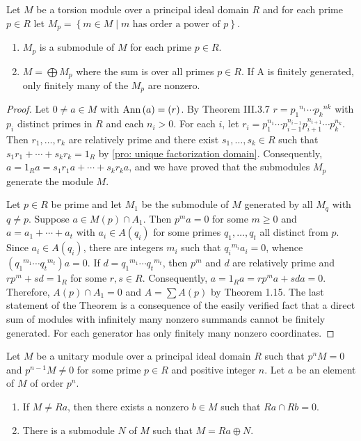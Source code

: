 \begin{theorem}
    Let $M$ be a torsion module over a principal ideal domain $R$ and for each prime $p \in R$ let $M_p=\left\{m \in M \mid m \text{ has order a power of } p\right\}$.
    \begin{enumerate}
        \item
              $M_p$ is a submodule of $M$ for each prime $p \in R$.

        \item
              $M=\bigoplus M_p$ where the sum is over all primes $p \in R$. If A is finitely generated, only finitely many of the $M_p$ are nonzero.
    \end{enumerate}
    \begin{proof}
        Let $0 \neq a \in M$ with $\operatorname{\operatorname{Ann}}\left(a\right)=(r)$.
        By Theorem III.3.7 $r=p_1{ }^{n_1} \cdots p_k{ }^{n k}$ with $p_i$ distinct primes in $R$ and each $n_i>0$.
        For each $i$, let $r_i=p_1^{n_1} \cdots p_{i-1}^{n_{i-1}} p_{i+1}^{n_{i+1}} \cdots p_k^{n_k}$.
        Then $r_1, \ldots, r_k$ are relatively prime and there exist $s_1, \ldots, s_k \in R$ such that $s_1 r_1+\cdots+ s_k r_k=1_R$ by \ref{pro: unique factorization domain}.
        Consequently, $a=1_R a=s_1 r_1 a+\cdots+s_k r_k a$, and we have proved that the submodules $M_p$ generate the module $M$.

        Let $p \in R$ be prime and let $M_1$ be the submodule of $M$ generated by all $M_q$ with $q \neq p$.
        Suppose $a \in M(p) \cap A_1$. Then $p^m a=0$ for some $m \geq 0$ and $a=a_1+\cdots+a_t$ with $a_i \in A\left(q_i\right)$ for some primes $q_1, \ldots, q_t$ all distinct from $p$. Since $a_i \in A\left(q_i\right)$, there are integers $m_i$ such that $q_i{ }^{m_i} a_i=0$, whence $\left(q_1{ }^{m_1} \cdots q_t{ }^{m_t}\right) a=0$. If $d=q_1{ }^{m_1} \cdots q_t{ }^{m_t}$, then $p^m$ and $d$ are relatively prime and $r p^m+s d=1_R$ for some $r, s \in R$. Consequently, $a=1_R a=r p^m a+s d a=0$. Therefore, $A(p) \cap A_1=0$ and $A=\sum A(p)$ by Theorem 1.15. The last statement of the Theorem is a consequence of the easily verified fact that a direct sum of modules with infinitely many nonzero summands cannot be finitely generated. For each generator has only finitely many nonzero coordinates.
    \end{proof}
\end{theorem}
\begin{lemma}
    Let $M$ be a unitary module over a principal ideal domain $R$ such that $p^{n} M=0$ and $p^{n-1} M \neq 0$ for some prime $p \in R$ and positive integer $n$.
    Let $a$ be an element of $M$ of order $p^{n}$.
    \begin{enumerate}
        \item
              If $M \neq Ra$, then there exists a nonzero $b \in M$ such that $Ra \cap Rb=0$.
        \item
              There is a submodule $N$ of $M$ such that $M=Ra \oplus N$.
    \end{enumerate}
\end{lemma}

